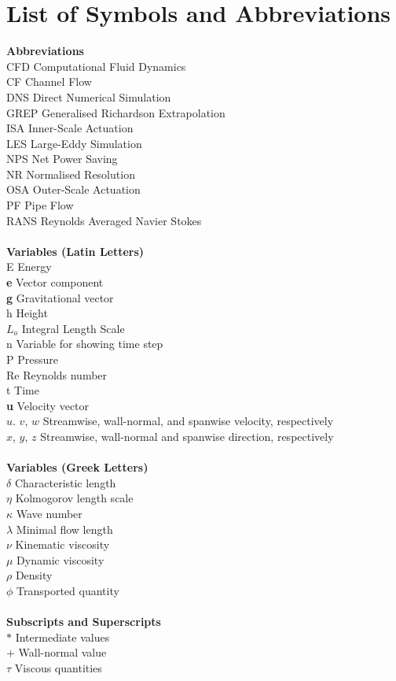
\section*{List of Symbols and Abbreviations}
\begin{tabbing}
	\textbf{Abbreviations} \= \\
	CFD \> Computational Fluid Dynamics\\
	CF \> Channel Flow \\
	DNS \> Direct Numerical Simulation \\
	GREP \> Generalised Richardson Extrapolation \\
	ISA \> Inner-Scale Actuation \\
	LES \> Large-Eddy Simulation\\
	NPS \> Net Power Saving \\
	NR \> Normalised Resolution \\
	OSA \> Outer-Scale Actuation\\
	PF \> Pipe Flow \\
	RANS \> Reynolds Averaged Navier Stokes\\
	\\
	\textbf{Variables (Latin Letters)}\\
	E \> Energy\\
	\textbf{e} \> Vector component \\
	\textbf{g} \> Gravitational vector \\
	h \> Height \\
	$L_o$ \> Integral Length Scale\\
	n \> Variable for showing time step \\
	P \> Pressure \\
	Re \> Reynolds number\\
	t \> Time \\
	\textbf{u} \> Velocity vector \\
	$u$. $v$, $w$ \> Streamwise, wall-normal, and spanwise velocity, respectively\\
	$x$, $y$, $z$  \> Streamwise, wall-normal and spanwise direction, respectively\\
	\\
	
	\textbf{Variables (Greek Letters)}\\
	$\delta$ \> Characteristic length \\
	$\eta$ \> Kolmogorov length scale\\
	$\kappa$ \> Wave number \\
	$\lambda$ \> Minimal flow length \\
	$\nu$ \> Kinematic viscosity \\
	$\mu$ \> Dynamic viscosity\\
	$\rho$ \> Density\\
	$\phi$ \> Transported quantity
	\\
	\\
	\textbf{Subscripts and Superscripts}\\
	$*$ \> Intermediate values\\
	$+$ \> Wall-normal value\\
	$\tau$ \> Viscous quantities
	
\end{tabbing}







